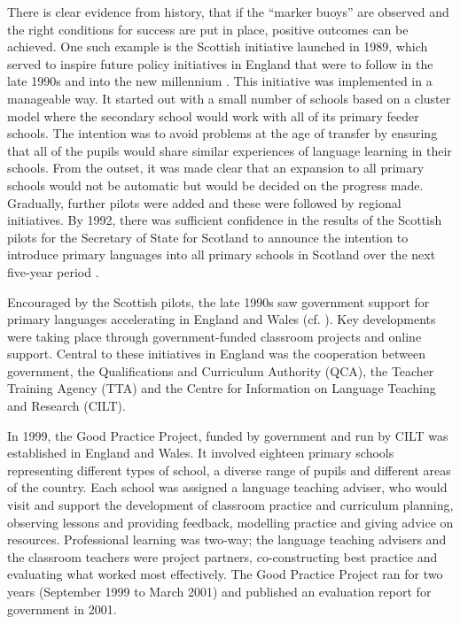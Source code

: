 \documentclass[output=paper]{langscibook}
\begin{document}
There is clear evidence from history, that if the ``marker buoys'' are observed and the right conditions for success are put in place, positive outcomes can be achieved. One such example is the Scottish initiative launched in 1989, which served to inspire future policy initiatives in England that were to follow in the late 1990s and into the new millennium \citep{NuffieldFoundation2000}. This initiative was implemented in a manageable way. It started out with a small number of schools based on a cluster model where the secondary school would work with all of its primary feeder schools. The intention was to avoid problems at the age of transfer by ensuring that all of the pupils would share similar experiences of language learning in their schools. From the outset, it was made clear that an expansion to all primary schools would not be automatic but would be decided on the progress made. Gradually, further pilots were added and these were followed by regional initiatives. By 1992, there was sufficient confidence in the results of the Scottish pilots for the Secretary of State for Scotland to announce the intention to introduce primary languages into all primary schools in Scotland over the next five-year period \citep{Johnstone1996}. 

Encouraged by the Scottish pilots, the late 1990s saw government support for primary languages accelerating in England and Wales (cf. \citealt{MorganNeil2001}). Key developments were taking place through government-funded classroom projects and online support. Central to these initiatives in England was the cooperation between government, the Qualifications and Curriculum Authority (QCA), the Teacher Training Agency (TTA) and the Centre for Information on Language Teaching and Research (CILT). 

In 1999, the Good Practice Project, funded by government and run by CILT was established in England and Wales. It involved eighteen primary schools representing different types of school, a diverse range of pupils and different areas of the country. Each school was assigned a language teaching adviser, who would visit and support the development of classroom practice and curriculum planning, observing lessons and providing feedback, modelling practice and giving advice on resources. Professional learning was two-way; the language teaching advisers and the classroom teachers were project partners, co-constructing best practice and evaluating what worked most effectively.  The Good Practice Project ran for two years (September 1999 to March 2001) and published an evaluation report for government in 2001.
\end{document}
